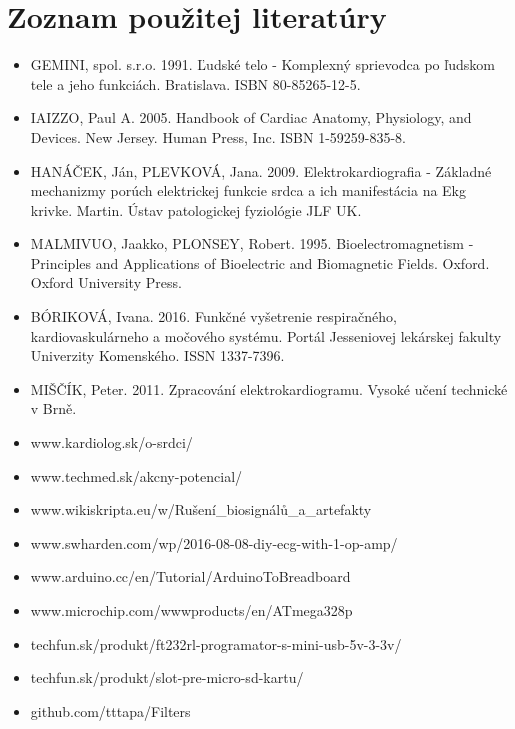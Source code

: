 \documentclass[titlepage]{article}
\begin{document}
\section*{Zoznam použitej literatúry}
\begin{itemize}
\item GEMINI, spol. s.r.o. 1991. Ľudské telo - Komplexný sprievodca po ľudskom tele a jeho funkciách. Bratislava. ISBN 80-85265-12-5.
\item IAIZZO, Paul A. 2005. Handbook of Cardiac Anatomy, Physiology, and Devices. New Jersey. Human Press, Inc. ISBN 1-59259-835-8.
\item HANÁČEK, Ján, PLEVKOVÁ, Jana. 2009. Elektrokardiografia - Základné mechanizmy porúch elektrickej funkcie srdca a ich manifestácia na Ekg krivke. Martin. Ústav patologickej fyziológie JLF UK.
\item MALMIVUO, Jaakko, PLONSEY, Robert. 1995. Bioelectromagnetism - Principles and Applications of Bioelectric and Biomagnetic Fields. Oxford. Oxford University Press.
\item BÓRIKOVÁ, Ivana. 2016. Funkčné vyšetrenie respiračného, kardiovaskulárneho a močového systému. Portál Jesseniovej lekárskej fakulty Univerzity Komenského. ISSN 1337-7396.
\item MIŠČÍK, Peter. 2011. Zpracování elektrokardiogramu. Vysoké učení technické v Brně. 
\item www.kardiolog.sk/o-srdci/
\item www.techmed.sk/akcny-potencial/
\item www.wikiskripta.eu/w/Rušení\_biosignálů\_a\_artefakty
\item www.swharden.com/wp/2016-08-08-diy-ecg-with-1-op-amp/
\item www.arduino.cc/en/Tutorial/ArduinoToBreadboard
\item www.microchip.com/wwwproducts/en/ATmega328p
\item techfun.sk/produkt/ft232rl-programator-s-mini-usb-5v-3-3v/
\item techfun.sk/produkt/slot-pre-micro-sd-kartu/
\item github.com/tttapa/Filters

\end{itemize}
\end{document}
